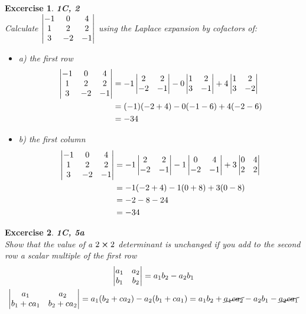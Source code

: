 \documentclass[11pt]{article}
\newtheorem{excercise}{Excercise}
\begin{document}
    \begin{excercise}
        \textbf{1C, 2}\\
        Calculate $\vmqty{-1 & 0 & 4 \\ 1 & 2 & 2 \\ 3 & -2 & -1}$ using the Laplace expansion by cofactors of:
        \begin{itemize}
            \item a) the first row\\
            \begin{align}
                \vmqty{-1 & 0 & 4 \\ 1 & 2 & 2 \\ 3 & -2 & -1}
                & =-1\vmqty{2 & 2 \\ -2 & -1}
                -0\vmqty{1 & 2 \\ 3 & -1 }
                +4\vmqty{1 & 2 \\ 3 & -2}\\
                & = (-1)(-2+4) - 0(-1 -6) + 4(-2-6)\\
                & = -34
            \end{align}
            \item b) the first column\\
            \begin{align}
                \vmqty{-1 & 0 & 4 \\ 1 & 2 & 2 \\ 3 & -2 & -1}
                & = -1 \vmqty{2 & 2 \\ -2 & -1}
                -1\vmqty{0 & 4 \\ -2 & -1}
                +3\vmqty{0 & 4 \\ 2 & 2}\\
                & = -1(-2 + 4)
                -1(0+8)
                +3(0-8)\\
                & = -2 -8 - 24\\
                & = -34
            \end{align}
        \end{itemize}
    \end{excercise}

    \begin{excercise}
        \textbf{1C, 5a}\\
        Show that the value of a $2\cross2$ determinant is unchanged if you add to the second row a scalar multiple of the first row\\
        \begin{gather}
            \vmqty{a_1 & a_2 \\ b_1 & b_2} = a_1 b_2 - a_2 b_1 \\
            \vmqty{a_1 & a_2 \\ b_1 + ca_1 & b_2 + ca_2}=
            a_1 (b_2 + ca_2 ) - a_2 (b_1 + ca_1 )
            = a_1 b_2 + \cancel{a_1 c a_2} - a_2 b_1 - \cancel{a_2 c a_1}
        \end{gather}
    \end{excercise}
\end{document}
